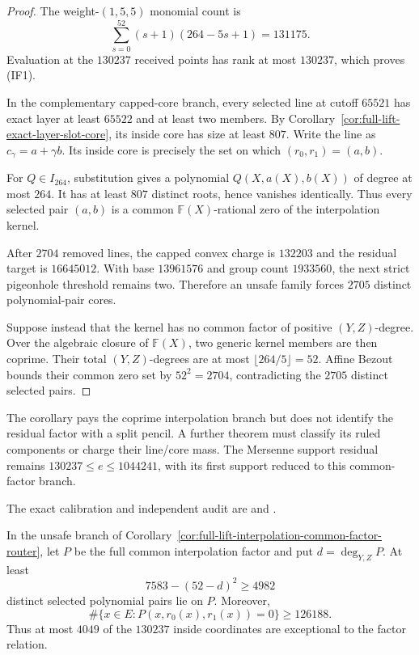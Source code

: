 \documentclass[11pt,a4paper]{amsart}
\numberwithin{equation}{section}
\theoremstyle{remark}
\newcommand{\F}{\mathbb F}\newcommand{\B}{\mathbb B}\newcommand{\K}{\mathbb K}\newcommand{\Z}{\mathbb Z}
\begin{document}
\begin{proof}
The weight-$(1,5,5)$ monomial count is
\[
 \sum_{s=0}^{52}(s+1)(264-5s+1)=131175.
\]
Evaluation at the $130237$ received points has rank at most $130237$, which
proves (IF1).

In the complementary capped-core branch, every selected line at cutoff
$65521$ has exact layer at least $65522$ and at least two members.  By
Corollary~\ref{cor:full-lift-exact-layer-slot-core}, its inside core has
size at least $807$.  Write the line as
$c_\gamma=a+\gamma b$.  Its inside core is precisely the set on which
$(r_0,r_1)=(a,b)$.

For $Q\in I_{264}$, substitution gives a polynomial
$Q(X,a(X),b(X))$ of degree at most $264$.  It has at least $807$ distinct
roots, hence vanishes identically.  Thus every selected pair $(a,b)$ is a
common $\F(X)$-rational zero of the interpolation kernel.

After $2704$ removed lines, the capped convex charge is $132203$ and the
residual target is $16645012$.  With base $13961576$ and group count
$1933560$, the next strict pigeonhole threshold remains two.  Therefore an
unsafe family forces $2705$ distinct polynomial-pair cores.

Suppose instead that the kernel has no common factor of positive
$(Y,Z)$-degree.  Over the algebraic closure of $\F(X)$, two generic kernel
members are then coprime.  Their total $(Y,Z)$-degrees are at most
$\lfloor264/5\rfloor=52$.  Affine Bezout bounds their common zero set by
$52^2=2704$, contradicting the $2705$ distinct selected pairs.
\end{proof}

\begin{remark}
The corollary pays the coprime interpolation branch but does not identify
the residual factor with a split pencil.  A further theorem must classify
its ruled components or charge their line/core mass.  The Mersenne support
residual remains $130237\le e\le1044241$, with its first support reduced to
this common-factor branch.

The exact calibration and independent audit are
and
.
\end{remark}

\begin{corollary}
\label{cor:full-lift-common-factor-mass}
In the unsafe branch of
Corollary~\ref{cor:full-lift-interpolation-common-factor-router}, let $P$ be
the full common interpolation factor and put
$d=\deg_{Y,Z}P$.  At least
\[
 7583-(52-d)^2\ge4982                              \tag{FM1}
\]
distinct selected polynomial pairs lie on $P$.  Moreover,
\[
 \#\{x\in E:P(x,r_0(x),r_1(x))=0\}\ge126188.       \tag{FM2}
\]
Thus at most $4049$ of the $130237$ inside coordinates are exceptional to
the factor relation.
\end{corollary}
\end{document}
